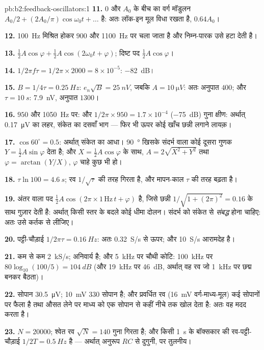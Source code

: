 \begin{solution}{pb:b2:feedback-oscillators:1}
\textbf{11.} $0$ और $A_0$ के बीच का वर्ग मॉडुलन $A_0/2 + (2A_0/\pi)
\cos\omega_0t + \dots$ है: अतः लॉक-इन मूल विधा रखता है, $0.64A_0$।

\textbf{12.} \qty{100}{Hz} मिश्रित होकर $900$ और \qty{1100}{Hz} पर चला जाता है और
निम्न-पारक उसे हटा देती है।

\textbf{13.} $\tfrac12A\cos\varphi + \tfrac12A\cos(2\omega_0t + \varphi)$; दिष्ट पद $\tfrac12A\cos\varphi$।

\textbf{14.} $1/2\pi f\tau = 1/2\pi \times 2000 = 8 \times 10^{-5}$: \qty{-82}{dB}।

\textbf{15.} $B = 1/4\tau = \qty{0.25}{Hz}$: $e_n\sqrt B = \qty{25}{nV}$, जबकि $A =
\qty{10}{\micro V}$: अतः अनुपात $400$; और $\tau = \qty{10}{s}$: \qty{7.9}{nV}, अनुपात $1300$।

\textbf{16.} $950$ और \qty{1050}{Hz} पर: और $1/2\pi \times 950 = 1.7 \times
10^{-4}$ (\qty{-75}{dB}) गुना क्षीण: अर्थात् \qty{0.17}{\micro V} का लहर, संकेत का दसवाँ भाग ---
फिर भी ऊपर कोई खाँच छन्नी लगाने लायक़।

\textbf{17.} $\cos60^\circ = 0.5$: अर्थात् संकेत का आधा। \qty{90}{\degree} खिसके संदर्भ वाला
कोई दूसरा गुणक $Y = \tfrac12A\sin\varphi$ देता है; और $X =
\tfrac12A\cos\varphi$ के साथ, $A = 2\sqrt{X^2 + Y^2}$ तथा $\varphi = \arctan(Y/X)$, $\varphi$ चाहे कुछ भी हो।

\textbf{18.} $\tau\ln100 = \qty{4.6}{s}$; रव $1/\sqrt\tau$ की तरह गिरता है, और
मापन-काल $\tau$ की तरह बढ़ता है।

\textbf{19.} अंतर वाला पद $\tfrac12A\cos(2\pi \times 1\,\text{Hz}\,t + \varphi)$ है,
जिसे छन्नी $1/\sqrt{1 + (2\pi)^2} = 0.16$ के साथ गुज़ार देती है: अर्थात् किसी स्तर के बदले कोई धीमा
दोलन। संदर्भ को संकेत से \emph{संबद्ध} होना चाहिए:
अतः उसे कर्तक से लीजिए।

\textbf{20.} पट्टी-चौड़ाई $1/2\pi\tau = \qty{0.16}{Hz}$: अतः \qty{0.32}{S/s} से ऊपर;
और \qty{10}{S/s} आरामदेह है।

\textbf{21.} कम से कम \qty{2}{kS/s};  अनिवार्य है;
और \qty{5}{kHz} पर चौथी कोटि: \qty{100}{kHz} पर $80\log_{10}(100/5) = \qty{104}{dB}$
(और \qty{19}{kHz} पर \qty{46}{dB}, अर्थात् वह रव जो \qty{1}{kHz} पर छद्म बनकर बैठता)।

\textbf{22.} सोपान \qty{30.5}{\micro V}; \qty{10}{mV} $330$ सोपान है; और प्रवर्धित
रव (\qty{16}{mV} वर्ग-माध्य-मूल) कई सोपानों पर फैला है तथा औसत लेने पर माध्य को
एक सोपान से कहीं नीचे तक खोल देता है: अतः वह मदद करता है।

\textbf{23.} $N = 20000$; श्वेत रव $\sqrt N = 140$ गुना गिरता है; और किसी
\qty{1}{s} के बॉक्सकार की रव-पट्टी-चौड़ाई $1/2T = \qty{0.5}{Hz}$ है --- अर्थात्
अनुरूप $RC$ से दुगुनी, पर तुलनीय।


\end{solution}
